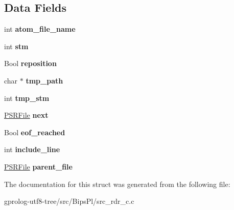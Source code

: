 \subsection*{Data Fields}
\begin{DoxyCompactItemize}
\item 
int {\bfseries atom\+\_\+file\+\_\+name}\hypertarget{structsr__file_ae27edb1456ddb3b0453eca14e614c66b}{}\label{structsr__file_ae27edb1456ddb3b0453eca14e614c66b}

\item 
int {\bfseries stm}\hypertarget{structsr__file_a586a54828b5daba157cc712806a6f2b3}{}\label{structsr__file_a586a54828b5daba157cc712806a6f2b3}

\item 
Bool {\bfseries reposition}\hypertarget{structsr__file_a090b36b9b75dfbccd963f6787fd3f18e}{}\label{structsr__file_a090b36b9b75dfbccd963f6787fd3f18e}

\item 
char $\ast$ {\bfseries tmp\+\_\+path}\hypertarget{structsr__file_adc9ad8d65ba5f5b3bfc7a6c6ca329d88}{}\label{structsr__file_adc9ad8d65ba5f5b3bfc7a6c6ca329d88}

\item 
int {\bfseries tmp\+\_\+stm}\hypertarget{structsr__file_a200078e5cefb8ff2bd556997ff08b429}{}\label{structsr__file_a200078e5cefb8ff2bd556997ff08b429}

\item 
\hyperlink{structsr__file}{P\+S\+R\+File} {\bfseries next}\hypertarget{structsr__file_aa8623a318506eaad8a03faca16a7e72e}{}\label{structsr__file_aa8623a318506eaad8a03faca16a7e72e}

\item 
Bool {\bfseries eof\+\_\+reached}\hypertarget{structsr__file_ae76a89a158199f98536900d0fccdd0c4}{}\label{structsr__file_ae76a89a158199f98536900d0fccdd0c4}

\item 
int {\bfseries include\+\_\+line}\hypertarget{structsr__file_ae50c7011dac81b055f3cfbf64ae03598}{}\label{structsr__file_ae50c7011dac81b055f3cfbf64ae03598}

\item 
\hyperlink{structsr__file}{P\+S\+R\+File} {\bfseries parent\+\_\+file}\hypertarget{structsr__file_a57283a9f804b73dcd5bca6982ba8ac95}{}\label{structsr__file_a57283a9f804b73dcd5bca6982ba8ac95}

\end{DoxyCompactItemize}


The documentation for this struct was generated from the following file\+:\begin{DoxyCompactItemize}
\item 
gprolog-\/utf8-\/tree/src/\+Bips\+Pl/src\+\_\+rdr\+\_\+c.\+c\end{DoxyCompactItemize}
